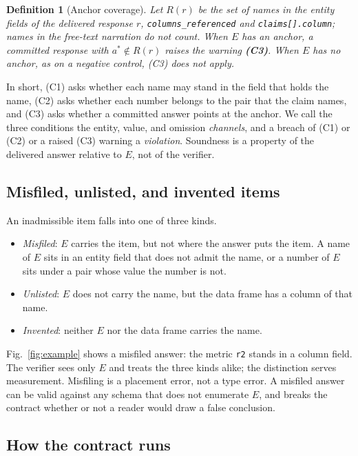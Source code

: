 \documentclass[journal]{IEEEtran}
\newtheorem{definitionx}{Definition}
\begin{document}
\begin{definitionx}[Anchor coverage]\label{def:anchor}
Let $R(r)$ be the set of names in the entity fields of the delivered response
$r$, \texttt{columns\_referenced} and \texttt{claims[].column}; names in the
free-text narration do not count. When $E$ has an anchor, a committed response
with $a^* \notin R(r)$ raises the warning \textbf{(C3)}. When $E$ has no anchor,
as on a negative control, (C3) does not apply.
\end{definitionx}

In short, (C1) asks whether each name may stand in the field that holds the
name, (C2) asks whether each number belongs to the pair that the claim names,
and (C3) asks whether a committed answer points at the anchor. We call the three
conditions the entity, value, and omission \emph{channels}, and a breach of (C1)
or (C2) or a raised (C3) warning a \emph{violation}. Soundness is a property of
the delivered answer relative to $E$, not of the verifier.

\subsection{Misfiled, unlisted, and invented items}

An inadmissible item falls into one of three kinds.
\begin{itemize}
\item \emph{Misfiled}: $E$ carries the item, but not where the answer puts the
item. A name of $E$ sits in an entity field that does not admit the name, or a
number of $E$ sits under a pair whose value the number is not.
\item \emph{Unlisted}: $E$ does not carry the name, but the data frame has a
column of that name.
\item \emph{Invented}: neither $E$ nor the data frame carries the name.
\end{itemize}
Fig.~\ref{fig:example} shows a misfiled answer: the metric \texttt{r2} stands in
a column field. The verifier sees only $E$ and treats the three kinds alike; the
distinction serves measurement. Misfiling is a placement error, not a type
error. A misfiled answer can be valid against any schema that does not enumerate
$E$, and breaks the contract whether or not a reader would draw a false
conclusion.

\subsection{How the contract runs}
\end{document}
